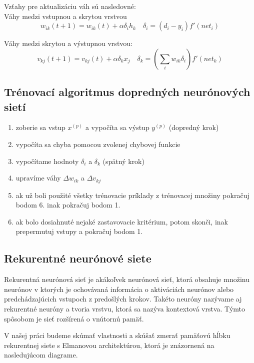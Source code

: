 Vzťahy pre aktualizáciu váh sú nasledovné: \\

Váhy medzi vstupnou a skrytou vrstvou
\begin{equation}
	w_{ik}(t+1) = w_{ik}(t) + \alpha\delta_{i}h_{k} \quad \delta_{i} = (d_i - y_i)f'(net_{i})
\end{equation}

Váhy medzi skrytou a výstupnou vrstvou: 
\begin{equation}
	v_{kj}(t+1) = v_{kj}(t) + \alpha\delta_{k}x_{j} \quad \delta_{k} = (\sum_{i} w_{ik}\delta_{i})f'(net_{k})
\end{equation}

\subsection{Trénovací algoritmus dopredných neurónových sietí}
\begin{enumerate}
	\item zoberie sa vstup $x^{(p)}$ a vypočíta sa výstup $y^{(p)}$ (dopredný krok)
	\item vypočíta sa chyba pomocou zvolenej chybovej funkcie
	\item vypočítame hodnoty $\delta_{i}$ a $\delta_{k}$  (spätný krok)
	\item upravíme váhy $\Delta w_{ik}$ a $\Delta v_{kj}$
	\item ak už boli použité všetky trénovacie príklady z trénovacej množiny pokračuj bodom 6. inak pokračuj bodom 1.
	\item ak bolo dosiahnuté nejaké zastavovacie kritérium, potom skonči, inak prepermutuj vstupy a pokračuj bodom 1.
\end{enumerate}
                         

\subsection{Rekurentné neurónové siete}
Rekurentná neurónová sieť je akákoľvek neurónová sieť, ktorá obsahuje množinu neurónov
v ktorých je ochovávaná informácia o aktiváciách neurónov alebo predchádzajúcich vstupoch z predošlých krokov. 
Takéto neuróny nazývame aj rekurentné neuróny a tvoria vrstvu, ktorá sa nazýva kontextová vrstva.
Týmto spôsobom je sieť rozšírená o vnútornú pamäť.

V našej práci budeme skúmať vlastnosti a skúšať zmerať pamäťovú hĺbku rekurentnej siete s Elmanovou architektúrou, 
ktorá je znázornená na nasledujúcom diagrame.

